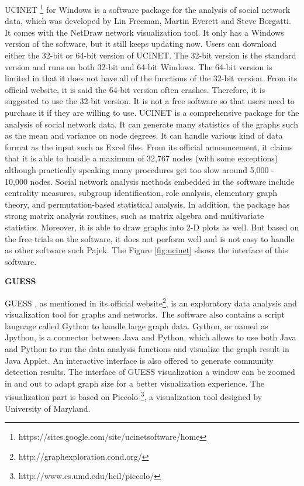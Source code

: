 UCINET \footnote{https://sites.google.com/site/ucinetsoftware/home} for Windows \cite{borgatti2014ucinet} is a software package for the analysis of social network data, which was developed by Lin Freeman, Martin Everett and Steve Borgatti. It comes with the NetDraw network visualization tool. It only has a Windows version of the software, but it still keeps updating now. Users can download either the 32-bit or 64-bit version of UCINET. The 32-bit version is the standard version and runs on both 32-bit and 64-bit Windows. The 64-bit version is limited in that it does not have all of the functions of the 32-bit version. From its official website, it is said the 64-bit version often crashes. Therefore, it is suggested to use the 32-bit version. It is not a free software so that users need to purchase it if they are willing to use. UCINET is a comprehensive package for the analysis of social network data. It can generate many statistics of the graphs such as the mean and variance on node degrees.  It can handle various kind of data format as the input such as Excel files. From its official announcement, it claims that it is able to handle a maximum of 32,767 nodes (with some exceptions) although practically speaking many procedures get too slow around 5,000 - 10,000 nodes. Social network analysis methods embedded in the software include centrality measures, subgroup identification, role analysis, elementary graph theory, and permutation-based statistical analysis. In addition, the package has strong matrix analysis routines, such as matrix algebra and multivariate statistics.
Moreover, it is able to draw graphs into 2-D plots as well. But based on the free trials on the software, it does not perform well and is not easy to handle as other  software such Pajek. The Figure \ref{fig:ucinet} shows the interface of this software.

\textbf{GUESS}

GUESS \cite{adar2007softguess}, as mentioned in its official website\footnote{http://graphexploration.cond.org/},  is an exploratory data analysis and visualization tool for graphs and networks. The software also contains a  script language called Gython to  handle large graph data. Gython, or named as Jpython, is a connector between Java and Python, which allows to use both Java and Python to run the data analysis functions and visualize the graph result in Java Applet. An interactive interface is also offered to generate community detection results.  The interface of GUESS visualization a window can be zoomed in and out to adapt graph size for a better visualization experience. The visualization part is based on Piccolo \footnote{http://www.cs.umd.edu/hcil/piccolo/}, a visualization tool designed by University of Maryland.


